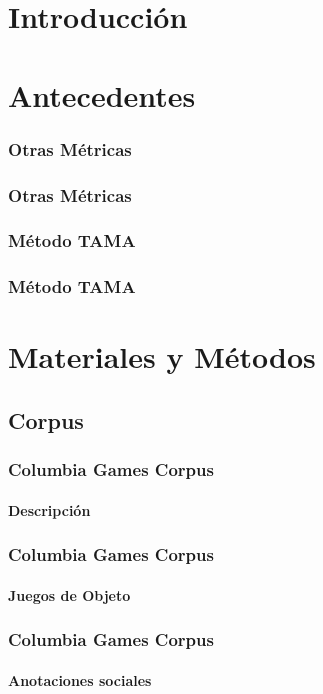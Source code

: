 \documentclass{beamer}
\title{\tituloTesis}
\author{Juan Manuel Pérez}
\begin{document}
\frame{\titlepage}





\section{Introducción}



\section{Antecedentes}

\begin{frame}
  \frametitle{Otras Métricas}
\end{frame}

\begin{frame}
  \frametitle{Otras Métricas}
  \subtitle{Problemas}
\end{frame}



\begin{frame}
  \frametitle{Método TAMA}
\end{frame}


\begin{frame}
  \frametitle{Método TAMA}
  \subtitle{Ventajas}
\end{frame}


\section{Materiales y Métodos}

\subsection{Corpus}
\begin{frame}
  \frametitle{Columbia Games Corpus}
  \framesubtitle{Descripción}

\end{frame}


\begin{frame}
  \frametitle{Columbia Games Corpus}
  \framesubtitle{Juegos de Objeto}

\end{frame}


\begin{frame}
  \frametitle{Columbia Games Corpus}
  \framesubtitle{Anotaciones sociales}

\end{frame}
\end{document}
